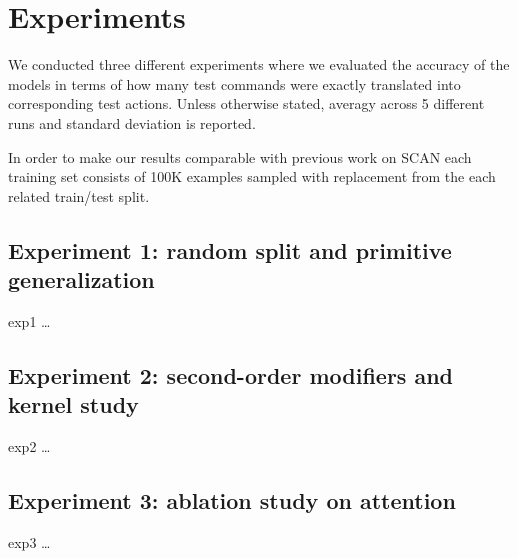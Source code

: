 \section{Experiments}
\label{sec:intro}

We conducted three different experiments where we evaluated the accuracy of the models in terms of how many test commands were exactly translated
into corresponding test actions. Unless otherwise stated, averagy across 5 different runs and standard deviation is reported.

In order to make our results comparable with previous work on SCAN each training set consists of 100K examples sampled with replacement
from the each related train/test split.

\subsection{Experiment 1: random split and primitive generalization}
\label{subsec:exp1}

exp1 \dots

\subsection{Experiment 2: second-order modifiers and kernel study}
\label{subsec:exp2}

exp2 \dots

\subsection{Experiment 3: ablation study on attention}
\label{subsec:exp3}

exp3 \dots



